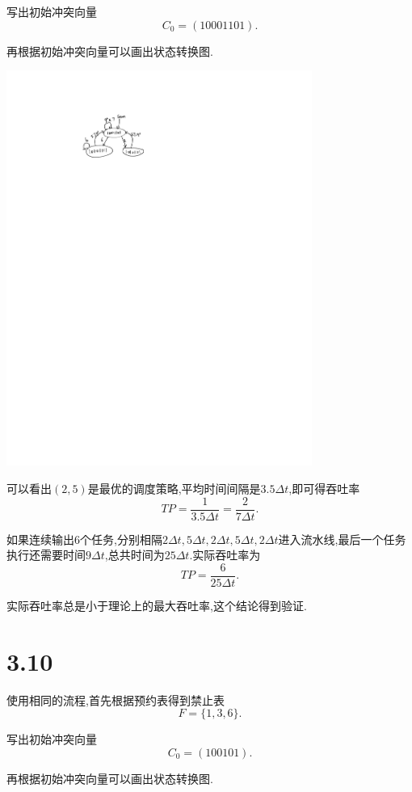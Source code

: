 \documentclass[adobefonts, nocap]{ctexart}
\begin{document}
    写出初始冲突向量
    \[
      C_{0}=(10001101).
    \]

    再根据初始冲突向量可以画出状态转换图.

    \begin{center}
      \includegraphics[width=10cm]{2-crop.pdf}
    \end{center}

    可以看出$(2,5)$是最优的调度策略,平均时间间隔是$3.5\Delta t$,即可得吞吐率
    \[
      TP=\frac{1}{3.5\Delta t}=\frac{2}{7\Delta t}.
    \]

    如果连续输出$6$个任务,分别相隔$2\Delta t, 5\Delta t, 2\Delta t, 5\Delta t, 2\Delta t$进入流水线,最后一个任务执行还需要时间$9\Delta t$,总共时间为$25\Delta t$.实际吞吐率为
    \[
      TP=\frac{6}{25\Delta t}.
    \]

    实际吞吐率总是小于理论上的最大吞吐率,这个结论得到验证.
  \section*{3.10}
    使用相同的流程,首先根据预约表得到禁止表
    \[
      F=\{1,3,6\}.
    \]

    写出初始冲突向量
    \[
      C_{0}=(100101).
    \]

    再根据初始冲突向量可以画出状态转换图.
\end{document}
